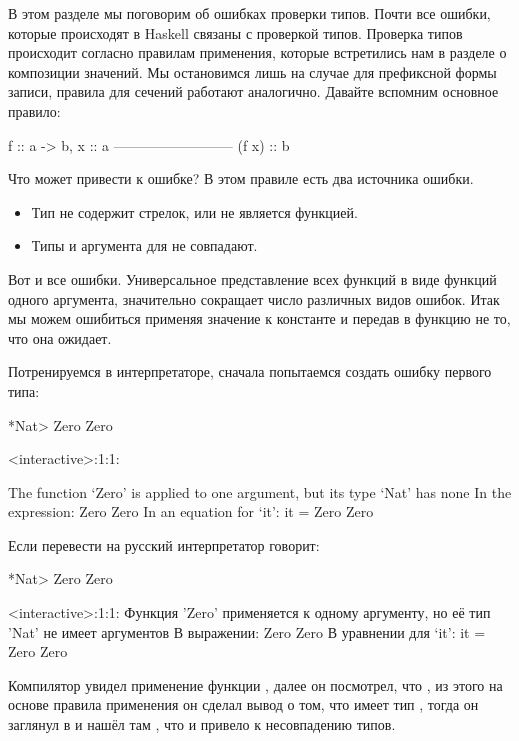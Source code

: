 В этом разделе мы поговорим об ошибках проверки типов. 
Почти все ошибки, которые происходят в Haskell связаны с 
проверкой типов. Проверка типов происходит согласно правилам
применения, которые встретились нам в разделе о композиции 
значений. 
Мы остановимся лишь на случае для префиксной формы записи, 
правила для сечений работают аналогично. 
Давайте вспомним основное правило:

\begin{code}
                    f :: a -> b,       x :: a
                    --------------------------
                            (f x) :: b
\end{code}

Что может привести к ошибке? В этом правиле есть
два источника ошибки. 

\begin{itemize}
\item Тип  не содержит стрелок, или  не является функцией. 
\item Типы  и аргумента для  не совпадают.
\end{itemize}

Вот и все ошибки. Универсальное представление всех функций 
в виде функций одного аргумента, значительно сокращает число
различных видов ошибок. Итак мы можем ошибиться применяя
значение к константе и передав в функцию не то, что она
ожидает.

Потренируемся в интерпретаторе, сначала попытаемся
создать ошибку первого типа:

\begin{code}
*Nat> Zero Zero

<interactive>:1:1:

    The function `Zero' is applied to one argument,
    but its type `Nat' has none
    In the expression: Zero Zero
    In an equation for `it': it = Zero Zero
\end{code}

Если перевести на русский интерпретатор говорит: 

\begin{code}
*Nat> Zero Zero

<interactive>:1:1:
    Функция 'Zero' применяется к одному аргументу,
    но её тип 'Nat' не имеет аргументов
    В выражении: Zero Zero
    В уравнении для `it': it = Zero Zero
\end{code}

Компилятор увидел применение функции , далее он 
посмотрел, что , из этого на основе правила применения
он сделал вывод о том, что  имеет тип ,
тогда он заглянул в  и нашёл там , что
и привело к несовпадению типов. 

